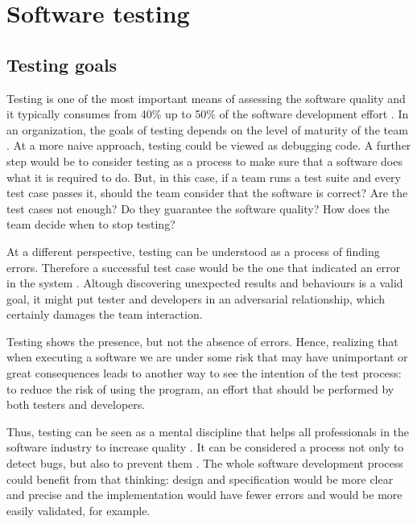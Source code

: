 \section{Software testing}
\label{sec:tests}

\subsection{Testing goals}

Testing is one of the most important means of assessing the software quality and it typically consumes from 40\% up to 50\% of the software development effort \cite{Luo}. In an organization, the goals of testing depends on the level of maturity of the team \cite{Ammann:08}. At a more naive approach, testing could be viewed as debugging code. A further step would be to consider testing as a process to make sure that a software does what it is required to do. But, in this case, if a team runs a test suite and every test case passes it, should the team consider that the software is correct? Are the test cases not enough? Do they guarantee the software quality? How does the team decide when to stop testing? 

At a different perspective, testing can be understood as a process of finding errors. Therefore a successful test case would be the one that indicated an error in the system \cite{Myers:12}. Altough discovering unexpected results and behaviours is a valid goal, it might put tester and developers in an adversarial relationship, which certainly damages the team interaction. 

Testing shows the presence, but not the absence of errors. Hence, realizing that when executing a software we are under some risk that may have unimportant or great consequences leads to another way to see the intention of the test process: to reduce the risk of using the program, an effort that should be performed by both testers and developers. 

Thus, testing can be seen as a mental discipline that helps all professionals in the software industry to increase quality \cite{Ammann:08}. It can be considered a process not only to detect bugs, but also to prevent them \cite{Beizer}. The whole software development process could benefit from that thinking: design and specification would be more clear and precise and the implementation would have fewer errors and would be more easily validated, for example.


